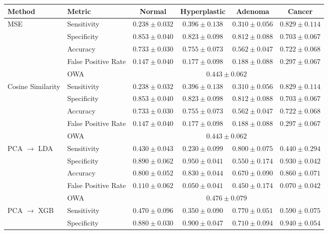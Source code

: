 \begin{table}[htbp]
\centering
\begin{tabular}{llcccc}
\toprule
Method & Metric & Normal & Hyperplastic & Adenoma & Cancer \\
\midrule
MSE & Sensitivity         & $0.238\pm0.032$ & $0.396\pm0.138$ & $0.310\pm0.056$ & $0.829\pm0.114$ \\
    & Specificity         & $0.853\pm0.040$ & $0.823\pm0.098$ & $0.812\pm0.088$ & $0.703\pm0.067$ \\
    & Accuracy            & $0.733\pm0.030$ & $0.755\pm0.073$ & $0.562\pm0.047$ & $0.722\pm0.068$ \\
    & False Positive Rate & $0.147\pm0.040$ & $0.177\pm0.098$ & $0.188\pm0.088$ & $0.297\pm0.067$ \\
    & OWA & \multicolumn{4}{c}{$0.443\pm0.062$} \\
\midrule
Cosine Similarity & Sensitivity         & $0.238\pm0.032$ & $0.396\pm0.138$ & $0.310\pm0.056$ & $0.829\pm0.114$ \\
                  & Specificity         & $0.853\pm0.040$ & $0.823\pm0.098$ & $0.812\pm0.088$ & $0.703\pm0.067$ \\
                  & Accuracy            & $0.733\pm0.030$ & $0.755\pm0.073$ & $0.562\pm0.047$ & $0.722\pm0.068$ \\
                  & False Positive Rate & $0.147\pm0.040$ & $0.177\pm0.098$ & $0.188\pm0.088$ & $0.297\pm0.067$ \\
                  & OWA & \multicolumn{4}{c}{$0.443\pm0.062$} \\
\midrule
PCA $\to$ LDA & Sensitivity         & $0.430\pm0.043$ & $0.230\pm0.099$ & $0.800\pm0.075$ & $0.440\pm0.294$ \\
              & Specificity         & $0.890\pm0.062$ & $0.950\pm0.041$ & $0.550\pm0.174$ & $0.930\pm0.042$ \\
              & Accuracy            & $0.800\pm0.052$ & $0.830\pm0.044$ & $0.670\pm0.090$ & $0.860\pm0.071$ \\
              & False Positive Rate & $0.110\pm0.062$ & $0.050\pm0.041$ & $0.450\pm0.174$ & $0.070\pm0.042$ \\
              & OWA & \multicolumn{4}{c}{$0.476\pm0.079$} \\
\midrule
PCA $\to$ XGB & Sensitivity         & $0.470\pm0.096$ & $0.350\pm0.090$ & $0.770\pm0.051$ & $0.590\pm0.075$ \\
              & Specificity         & $0.880\pm0.030$ & $0.900\pm0.047$ & $0.710\pm0.094$ & $0.940\pm0.054$ \\

\end{tabular}
\end{table}
